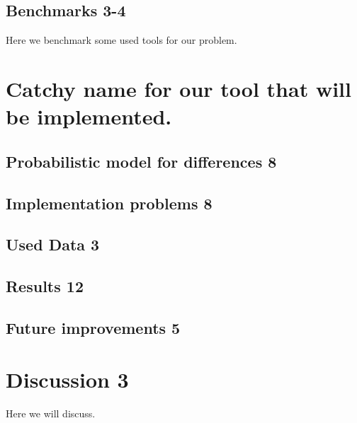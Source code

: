 \section{Benchmarks 3-4}
Here we benchmark some used tools for our problem.


\chapter{Catchy name for our tool that will be implemented.}
	\section{Probabilistic model for differences 8}
	\section{Implementation problems 8}
	\section{Used Data 3}
	\section{Results 12}
	\section{Future improvements 5}

\chapter{Discussion 3}
Here we will discuss.



